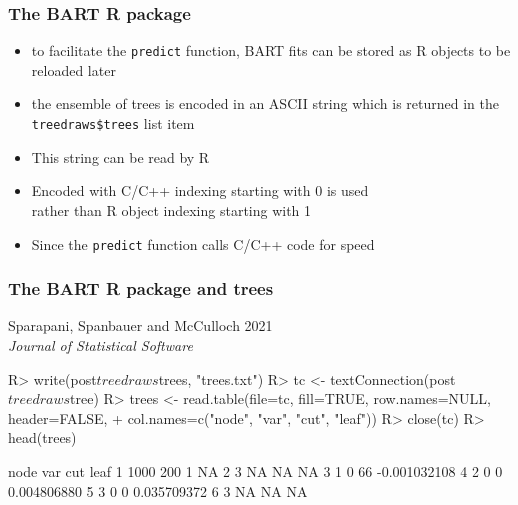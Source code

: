\documentclass[11pt,dvipsnames,usenames,times]{beamer}
\begin{document}
\begin{frame}[fragile]
\frametitle{The BART R package}
\begin{itemize}
\item to facilitate the {\tt predict} function,
BART fits can be stored as R objects to be reloaded later
\item the ensemble of trees is encoded in an ASCII string
which is returned in the {\tt treedraws\$trees} 
 list item%
\item This string can be read by {R}
\item Encoded with C/C++ indexing starting with 0 is used\\
rather than R object indexing starting with 1
\item Since the {\tt predict} function calls C/C++ code for speed
\end{itemize}
\end{frame}

\begin{frame}[fragile]
\frametitle{The BART R package and trees}
Sparapani, Spanbauer and McCulloch 2021\\ 
{\it Journal of Statistical Software}
\begin{Sinput}
R> write(post$treedraws$trees, "trees.txt")
R> tc <- textConnection(post$treedraws$tree)
R> trees <- read.table(file=tc, fill=TRUE, row.names=NULL, header=FALSE,
+    col.names=c("node", "var", "cut", "leaf"))
R> close(tc)
R> head(trees)
\end{Sinput}
\begin{minipage}{6cm}
\begin{Soutput}
  node var cut         leaf
1 1000 200   1           NA
2    3  NA  NA           NA
3    1   0  66 -0.001032108
4    2   0   0  0.004806880
5    3   0   0  0.035709372
6    3  NA  NA           NA
\end{Soutput}
\end{minipage}
\begin{minipage}{3cm}
\usetikzlibrary{shadows}
\end{minipage} 
\end{frame}
\end{document}
